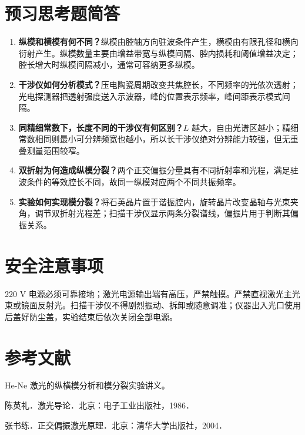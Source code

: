 \documentclass[UTF8,a4paper,10pt]{ctexart}
\begin{document}
\section{预习思考题简答}

\begin{enumerate}
  \item \textbf{纵模和横模有何不同？}\quad 纵模由腔轴方向驻波条件产生，横模由有限孔径和横向衍射产生。纵模数量主要由增益带宽与纵模间隔、腔内损耗和阈值增益决定；腔长增大时纵模间隔减小，通常可容纳更多纵模。
  \item \textbf{干涉仪如何分析模式？}\quad 压电陶瓷周期改变共焦腔长，不同频率的光依次透射；光电探测器把透射强度送入示波器，峰的位置表示频率，峰间距表示模式间隔。
  \item \textbf{同精细常数下，长度不同的干涉仪有何区别？}\quad $L$ 越大，自由光谱区越小；精细常数相同则最小可分辨频宽也越小，所以长干涉仪绝对分辨能力较强，但无重叠测量范围较窄。
  \item \textbf{双折射为何造成纵模分裂？}\quad 两个正交偏振分量具有不同折射率和光程，满足驻波条件的等效腔长不同，故同一纵模对应两个不同共振频率。
  \item \textbf{实验如何实现模分裂？}\quad 将石英晶片置于谐振腔内，旋转晶片改变晶轴与光束夹角，调节双折射光程差；扫描干涉仪显示两条分裂谱线，偏振片用于判断其偏振关系。
\end{enumerate}

\section{安全注意事项}

220 V 电源必须可靠接地；激光电源输出端有高压，严禁触摸。严禁直视激光主光束或镜面反射光。扫描干涉仪不得剧烈振动、拆卸或随意调准；仪器出入光口使用后盖好防尘盖，实验结束后依次关闭全部电源。

\section{参考文献}

\begin{enumerate}[label={[\arabic*]},itemsep=0pt]
  \item He-Ne 激光的纵横模分析和模分裂实验讲义。
  \item 陈英礼．激光导论．北京：电子工业出版社，1986．
  \item 张书练．正交偏振激光原理．北京：清华大学出版社，2004．
\end{enumerate}
\end{document}

